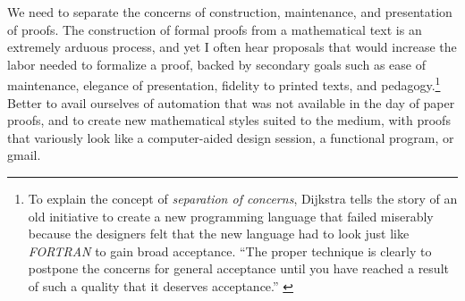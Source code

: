 \documentclass{llncs}
\begin{document}
We need to separate the concerns of construction, maintenance, and
presentation of proofs.  The construction of formal proofs from a
mathematical text is an extremely arduous process, and yet I often
hear proposals that would increase the labor needed to formalize a
proof, backed by secondary goals such as ease of maintenance, elegance of
presentation, fidelity to printed texts, and pedagogy.\footnote{%
  To explain the concept of {\it separation of concerns}, Dijkstra
  tells the story of an old initiative to create a new programming
  language that failed miserably because the designers felt that the
  new language had to look just like {\it FORTRAN} to gain broad
  acceptance. ``The proper technique is clearly to postpone the
  concerns for general acceptance until you have reached a result of
  such a quality that it deserves acceptance.''
  \cite{DijkST}} %
Better to avail ourselves of automation that was not available in the
day of paper proofs, and to create new mathematical styles suited to
the medium, with proofs that variously look like a
%
computer-aided design session, a functional program, or gmail.
%
%
\end{document}
